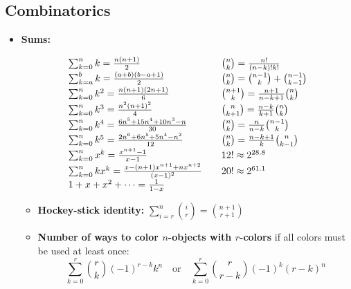 \subsection{Combinatorics}

\begin{small}
\begin{itemize}
    \item \textbf{Sums:}
    \begin{center}
    \[
    \begin{array}{@{}l@{\qquad}l@{}}
        \sum_{k=0}^n k = \frac{n(n+1)}{2}
            & {n \choose k} = \frac{n!}{(n-k)!k!} \\[2pt]

        \sum_{k=a}^b k = \frac{(a+b)(b-a+1)}{2}
            & {n \choose k} = {n-1 \choose k} + {n-1 \choose k-1} \\[2pt]

        \sum_{k=0}^n k^2 = \frac{n(n+1)(2n+1)}{6}
            & {n+1 \choose k} = \frac{n+1}{n-k+1}{n \choose k} \\[2pt]

        \sum_{k=0}^n k^3 = \frac{n^2(n+1)^2}{4}
            & {n \choose k+1} = \frac{n-k}{k+1}{n \choose k} \\[2pt]

        \sum_{k=0}^n k^4 =
            \frac{6n^5+15n^4+10n^3-n}{30}
            & {n \choose k} = \frac{n}{n-k}{n-1 \choose k} \\[2pt]

        \sum_{k=0}^n k^5 =
            \frac{2n^6+6n^5+5n^4-n^2}{12}
            & {n \choose k} = \frac{n-k+1}{k}{n \choose k-1} \\[2pt]

        \sum_{k=0}^n x^k = \frac{x^{n+1}-1}{x-1}
            & 12! \approx 2^{28.8} \\[2pt]

        \sum_{k=0}^n kx^k =
            \frac{x-(n+1)x^{n+1}+nx^{n+2}}{(x-1)^2}
            & 20! \approx 2^{61.1} \\[2pt]

        1+x+x^2+\dots = \frac{1}{1-x}
            &
    \end{array}
    \]
    \end{center}
    \begin{itemize}
        \item \textbf{Hockey-stick identity:} $\sum_{i=r}^{n}\binom{i}{r} = \binom{n+1}{r+1}$
        \item \textbf{Number of ways to color $n$-objects with $r$-colors} if all colors must be used at least once:
        \[ \sum_{k=0}^r {r \choose k}(-1)^{r-k}k^n \quad \text{or} \quad \sum_{k=0}^r {r \choose r-k}(-1)^{k}(r-k)^n \]
    \end{itemize}


\end{itemize}
\end{small}
